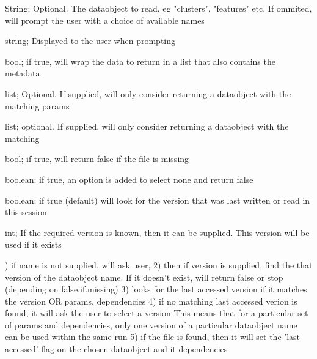 \documentclass[a4paper]{book}
\begin{document}
%
\begin{Arguments}
\begin{ldescription}
\item[\code{name}] String; Optional. The dataobject to read, eg "clusters", "features" etc.  If ommited, will prompt the user with a choice of available names

\item[\code{purpose}] string; Displayed to the user when prompting

\item[\code{include.meta}] bool; if true, will wrap the data to return in a list that also contains the metadata

\item[\code{params}] list; Optional. If supplied, will only consider returning a dataobject with the matching params

\item[\code{dependencies}] list; optional. If supplied, will only consider returning a dataobject with the matching

\item[\code{false.if.missing}] bool; if true, will return false if the file is missing

\item[\code{optional}] boolean; if true, an option is added to select none and return false

\item[\code{use.last.accessed}] boolean; if true (default) will look for the version that was last written or read in this session

\item[\code{version}] int; If the required version is known, then it can be supplied. This version will be used if it exists
\end{ldescription}
\end{Arguments}
%
\begin{Details}) if name is not supplied, will ask user,
2) then if version is supplied, find the that version of the dataobject name. If it doesn't exist, will return false or stop (depending on false.if.missing)
3) looks for the last accessed version if it matches the version OR  params, dependencies
4) if no matching last accessed verion is found, it will ask the user to select a version
This means that for a particular set of params and dependencies, only one version of a particular dataobject name can be used within the same run
5) if the file is found, then it will set the 'last accessed' flag
on the chosen dataobject and it dependencies
\end{Details}
\end{document}
